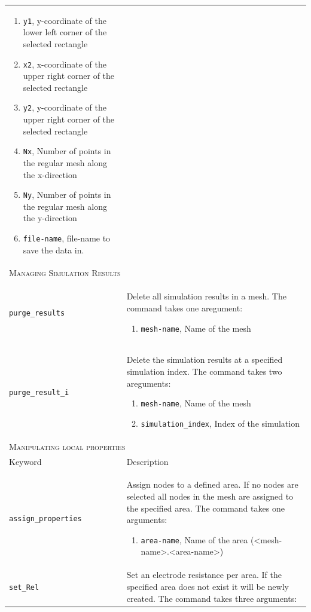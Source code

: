 \documentclass[noshowpacs,preprintnumbers,amsmath,amssymb, letter]{revtex4}
\begin{document}
\begin{longtable}{p{}p{}}
\begin{enumerate}
\item \texttt{y1}, y-coordinate of the lower left corner of the selected rectangle
\item \texttt{x2}, x-coordinate of the upper right corner of the selected rectangle
\item \texttt{y2}, y-coordinate of the upper right corner of the selected rectangle
\item \texttt{Nx}, Number of points in the regular mesh along the x-direction
\item \texttt{Ny}, Number of points in the regular mesh along the y-direction
\item \texttt{file-name}, file-name to save the data in.
\end{enumerate}\\
\multicolumn{2}{l}{\textsc{Managing Simulation Results}} \\*
\texttt{purge\_results}		& Delete all simulation results in a mesh. The command takes one aregument:
\begin{enumerate}
\item \texttt{mesh-name}, Name of the mesh
\end{enumerate}\\
\texttt{purge\_result\_i}		& Delete the simulation results at a specified simulation index. The command takes two areguments:
\begin{enumerate}
\item \texttt{mesh-name}, Name of the mesh
\item \texttt{simulation\_index}, Index of the simulation
\end{enumerate}\\
\multicolumn{2}{l}{\textsc{Manipulating local properties}} \\*
\hline
Keyword & Description \\
\texttt{assign\_properties}	&  Assign nodes to a defined area. If no nodes are selected all nodes in the mesh are assigned to the specified area. The command takes one arguments:
\begin{enumerate}
\item \texttt{area-name}, Name of the area (\textless mesh-name\textgreater .\textless area-name\textgreater )
\end{enumerate}\\
\texttt{set\_Rel}	&  Set an electrode resistance per area. If the specified area does not exist it will be newly created. The command takes three arguments:

\end{longtable}
\end{document}
